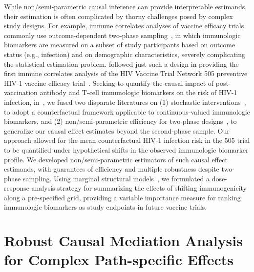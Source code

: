 While non/semi-parametric causal inference can provide interpretable estimands,
their estimation is often complicated by thorny challenges posed by complex
study designs. For example, immune correlates analyses of vaccine efficacy
trials commonly use outcome-dependent two-phase
sampling~\citep{haynes2012immune}, in which immunologic biomarkers are measured
on a subset of study participants based on outcome status (e.g., infection) and
on demographic characteristics, severely complicating the statistical estimation
problem. \citet{janes2017higher} followed just such a design in providing the
first immune correlates analysis of the HIV Vaccine Trial Network 505 preventive
HIV-1 vaccine efficacy trial~\citep{hammer2013efficacy}. Seeking to quantify the
causal impact of post-vaccination antibody and T-cell immunologic biomarkers on
the risk of HIV-1 infection, in~\citet{hejazi2020efficient}, we fused two
disparate literatures on (1) stochastic
interventions~\citep{stock1989nonparametric,diaz2012population}, to adopt
a counterfactual framework applicable to continuous-valued immunologic
biomarkers, and (2) non/semi-parametric efficiency for two-phase
designs~\citep{breslow2003large,rose2011targeted2sd}, to generalize our causal
effect estimates beyond the second-phase sample.
Our approach allowed for the mean counterfactual HIV-1 infection risk in the 505
trial to be quantified under hypothetical shifts in the observed immunologic
biomarker profile. We developed non/semi-parametric estimators of such causal
effect estimands, with guarantees of efficiency and multiple robustness despite
two-phase sampling. Using marginal structural
models~\citep{neugebauer2007nonparametric}, we formulated a dose-response
analysis strategy for summarizing the effects of shifting immunogenicity along
a pre-specified grid, providing a variable importance measure for ranking
immunologic biomarkers as study endpoints in future vaccine trials.

\section{Robust Causal Mediation Analysis for Complex Path-specific Effects}

